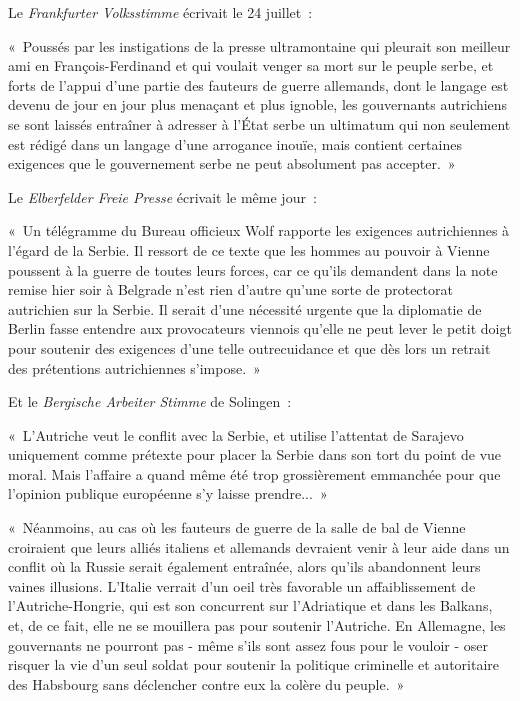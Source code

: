 \documentclass[french,twoside]{book} %
\newenvironment{quoteblock}%
  {\begin{quoting}}
  {\end{quoting}}
\newenvironment{quotebar}{%
    \def\FrameCommand{{\color{rubric!10!}\vrule width 0.5em} \hspace{0.9em}}%
    \def\OuterFrameSep{\itemsep} %
    \MakeFramed {\advance\hsize-\width \FrameRestore}
  }%
  {%
    \endMakeFramed
  }
\renewenvironment{quoteblock}%
  {%
    \savenotes
    \setstretch{0.9}
    \normalfont
    \begin{quotebar}
  }
  {%
    \end{quotebar}
    \spewnotes
  }
\begin{document}
\noindent Le \emph{Frankfurter Volksstimme} écrivait le 24 juillet :\par

\begin{quoteblock}
 \noindent « Poussés par les instigations de la presse ultramontaine qui pleurait son meilleur ami en François-Ferdinand et qui voulait venger sa mort sur le peuple serbe, et forts de l’appui d’une partie des fauteurs de guerre allemands, dont le langage est devenu de jour en jour plus menaçant et plus ignoble, les gouvernants autrichiens se sont laissés entraîner à adresser à l’État serbe un ultimatum qui non seulement est rédigé dans un langage d’une arrogance inouïe, mais contient certaines exigences que le gouvernement serbe ne peut absolument pas accepter. »
\end{quoteblock}

\noindent Le \emph{Elberfelder Freie Presse} écrivait le même jour :\par

\begin{quoteblock}
 \noindent « Un télégramme du Bureau officieux Wolf rapporte les exigences autrichiennes à l’égard de la Serbie. Il ressort de ce texte que les hommes au pouvoir à Vienne poussent à la guerre de toutes leurs forces, car ce qu’ils demandent dans la note remise hier soir à Belgrade n’est rien d’autre qu’une sorte de protectorat autrichien sur la Serbie. Il serait d’une nécessité urgente que la diplomatie de Berlin fasse entendre aux provocateurs viennois qu’elle ne peut lever le petit doigt pour soutenir des exigences d’une telle outrecuidance et que dès lors un retrait des prétentions autrichiennes s’impose. »
\end{quoteblock}

\noindent Et le \emph{Bergische Arbeiter Stimme} de Solingen :\par

\begin{quoteblock}
 \noindent « L'Autriche veut le conflit avec la Serbie, et utilise l’attentat de Sarajevo uniquement comme prétexte pour placer la Serbie dans son tort du point de vue moral. Mais l’affaire a quand même été trop grossièrement emmanchée pour que l’opinion publique européenne s’y laisse prendre... »\par
 « Néanmoins, au cas où les fauteurs de guerre de la salle de bal de Vienne croiraient que leurs alliés italiens et allemands devraient venir à leur aide dans un conflit où la Russie serait également entraînée, alors qu’ils abandonnent leurs vaines illusions. L'Italie verrait d’un oeil très favorable un affaiblissement de l’Autriche-Hongrie, qui est son concurrent sur l’Adriatique et dans les Balkans, et, de ce fait, elle ne se mouillera pas pour soutenir l’Autriche. En Allemagne, les gouvernants ne pourront pas - même s’ils sont assez fous pour le vouloir - oser risquer la vie d’un seul soldat pour soutenir la politique criminelle et autoritaire des Habsbourg sans déclencher contre eux la colère du peuple. »
\end{quoteblock}
\end{document}
